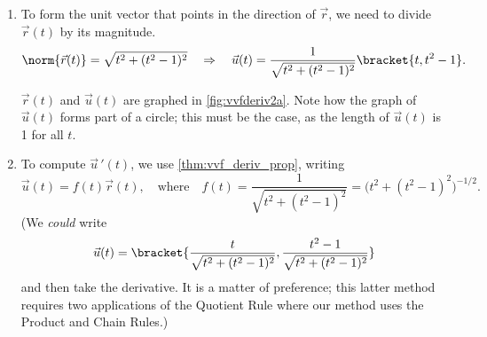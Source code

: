 {\begin{enumerate}
	\item To form the unit vector that points in the direction of $\vec r$, we need to divide $\vec r(t)$ by its magnitude. 
	$$\norm{\vec r(t)} = \sqrt{t^2+(t^2-1)^2} \quad \Rightarrow \quad \vec u(t) = \frac{1}{\sqrt{t^2+(t^2-1)^2}}\bracket{t,t^2-1}.$$
	
	$\vec r(t)$ and $\vec u(t)$ are graphed in \autoref{fig:vvfderiv2a}. Note how the graph of $\vec u(t)$ forms part of a circle; this must be the case, as the length of $\vec u(t)$ is 1 for all $t$.
	
	\item		To compute $\vec u\,'(t)$, we use \autoref{thm:vvf_deriv_prop}, writing $$\vec u(t) = f(t)\vec r(t),\quad  \text{where}\quad f(t) = \frac{1}{\sqrt{t^2+(t^2-1)^2}}=\big(t^2+(t^2-1)^2\big)^{-1/2}.$$ (We \emph{could} write $$\vec u(t) =\bracket{\frac{t}{\sqrt{t^2+(t^2-1)^2}}, \frac{t^2-1}{\sqrt{t^2+(t^2-1)^2}}}$$ and then take the derivative. It is a matter of preference; this latter method requires two applications of the Quotient Rule where our method uses the Product and Chain Rules.)
	

\end{enumerate}}
